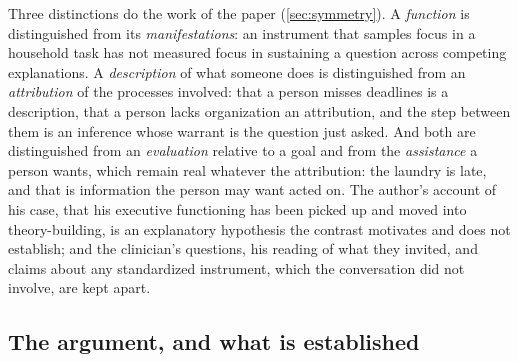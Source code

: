 Three distinctions do the work of the paper (\autoref{sec:symmetry}). A \emph{function} is distinguished from its \emph{manifestations}: an instrument that samples focus in a household task has not measured focus in sustaining a question across competing explanations. A \emph{description} of what someone does is distinguished from an \emph{attribution} of the processes involved: that a person misses deadlines is a description, that a person lacks organization an attribution, and the step between them is an inference whose warrant is the question just asked. And both are distinguished from an \emph{evaluation} relative to a goal and from the \emph{assistance} a person wants, which remain real whatever the attribution: the laundry is late, and that is information the person may want acted on. The author's account of his case, that his executive functioning has been picked up and moved into theory-building, is an explanatory hypothesis the contrast motivates and does not establish; and the clinician's questions, his reading of what they invited, and claims about any standardized instrument, which the conversation did not involve, are kept apart.

\subsection{The argument, and what is established}

